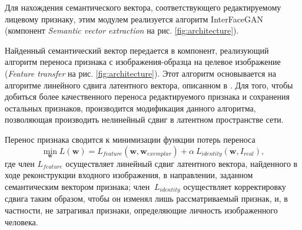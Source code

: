 \begin{enumerate}
Для нахождения семантического вектора, соответствующего редактируемому лицевому признаку, этим модулем реализуется алгоритм InterFaceGAN (компонент \emph{Semantic vector extraction} на рис. \ref{fig:architecture}).

Найденный семантический вектор передается в компонент, реализующий алгоритм переноса признака с изображения-образца на целевое изображение (\emph{Feature transfer} на рис. \ref{fig:architecture}).
Этот алгоритм основывается на алгоритме линейного сдвига латентного вектора, описанном в \cite{abdal2019image2stylegan}.
Для того, чтобы добиться более качественного переноса редактируемого признака и сохранения остальных признаков, производится модификация данного алгоритма, позволяющая производить нелинейный сдвиг в латентном пространстве сети.

Перенос признака сводится к минимизации функции потерь переноса
$$ 
\min_{\mathbf w} L(\mathbf w) = L_{feature}(\mathbf w, \mathbf w_{exemplar}) + \alpha~L_{identity}(\mathbf w, I_{real}),
$$
где член $L_{feature}$ осуществляет линейный сдвиг латентного вектора, найденного в ходе реконструкции входного изображения, в направлении, заданном семантическим вектором признака;  член $~L_{identity}$ осуществляет корректировку сдвига таким образом, чтобы он изменял лишь рассматриваемый признак, и, в частности, не затрагивал признаки, определяющие личность изображенного человека.

\end{enumerate}
